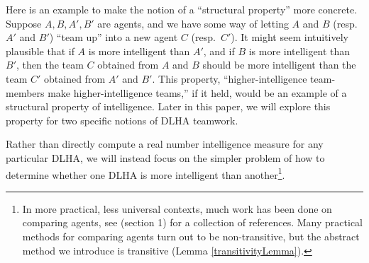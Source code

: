 \documentclass[twoside,11pt]{article}
\begin{document}
Here is an example to make the notion of a ``structural property'' more
concrete. Suppose $A,B,A',B'$ are agents, and we have some way of letting
$A$ and $B$ (resp.~$A'$ and $B'$) ``team up'' into a new agent $C$ (resp.~$C'$).
It might seem intuitively plausible that if $A$ is more
intelligent than $A'$, and if $B$ is more intelligent than $B'$, then the team
$C$ obtained from $A$ and $B$ should be more intelligent than the team $C'$
obtained from $A'$ and $B'$. This property, ``higher-intelligence team-members
make higher-intelligence teams,'' if it held, would be an example of a structural property
of intelligence. Later in this paper, we will explore this property for
two specific notions of DLHA teamwork.

Rather than directly compute a real number intelligence measure for any
particular DLHA, we will instead focus on the simpler problem of
how to determine whether one DLHA is more intelligent
than another\footnote{In more practical, less universal contexts, much work has
been done on comparing agents, see \cite{balduzzi} (section 1) for a collection
of references. Many practical methods for comparing agents turn out to be non-transitive,
but the abstract method we introduce is transitive (Lemma \ref{transitivityLemma}).}.
\end{document}
